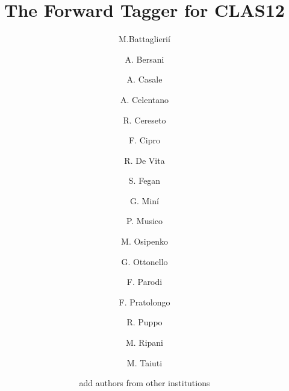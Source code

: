 \title{The Forward Tagger for CLAS12} %

\author[GEaddress]{M.Battaglieri\'i}
\author[GEaddress]{A. Bersani}
\author[GEaddress]{A. Casale}
\author[GEaddress]{A. Celentano}
\author[GEaddress]{R. Cereseto}
\author[GEaddress]{F. Cipro}
\author[GEaddress]{R. De Vita}
\author[JLABaddress]{S. Fegan}
\author[GEaddress]{G. Min\'i}
\author[GEaddress]{P. Musico}
\author[GEaddress]{M. Osipenko}
\author[GEaddress]{G. Ottonello}
\author[GEaddress]{F. Parodi}
\author[GEaddress]{F. Pratolongo}
\author[GEaddress]{R. Puppo}
\author[GEaddress]{M. Ripani}
\author[GEaddress,UNIGEaddress]{M. Taiuti}
\author{add authors from other institutions}


\address[GEaddress]{INFN - Sezione di Genova, Via Dodecaneso 33, I-16146 Genova,Italy}
\address[RM2address]{INFN, Sezione di Roma Tor Vergata, 00133 Rome, Italy}
\address[TOaddress]{INFN, Sezione di Torino, 10125 Torino, Italy}
\address[UNIGEaddress]{Universit\'a degli Studi di Genova, Via Dodecaneso 33, I-16146 Genova,Italy} 
\address[UNIRTVaddress]{Universit\'a di Roma Tor Vergata, 00133 Rome Italy} 
\address[JLABaddress]{Jefferson Lab, Newport News, VA 23606, USA}
\address[CEAaddress]{IRFU, CEA, Universit\'e Paris-Saclay, F-91191 Gif-sur-Yvette, France}
\address[YORKaddress]{University of York, York YO10 5DD, United Kingdom}
